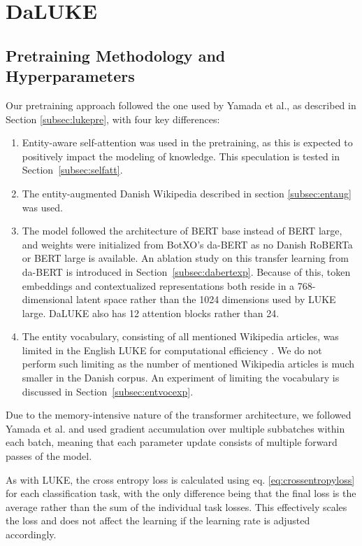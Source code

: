 \documentclass[main.tex]{subfiles}
\begin{document}
\section{DaLUKE}

\subsection{Pretraining Methodology and Hyperparameters}%
\label{sub:dalpre}
Our pretraining approach followed the one used by Yamada et al., as described in Section \ref{subsec:lukepre}, with four key differences:
\begin{enumerate}
    \item
        Entity-aware self-attention was used in the pretraining, as this is expected to positively impact the modeling of knowledge.
        This speculation is tested in Section~\ref{subsec:selfatt}.
    \item
        The entity-augmented Danish Wikipedia described in section \ref{subsec:entaug} was used.
    \item
        The model followed the architecture of BERT base instead of BERT large, and weights were initialized from BotXO's da-BERT \cite{botxo2019dabert} as no Danish RoBERTa or BERT large is available.
        An ablation study on this transfer learning from da-BERT is introduced in Section~\ref{subsec:dabertexp}.
        Because of this, token embeddings and contextualized representations both reside in a 768-dimensional latent space rather than the 1024 dimensions used by LUKE large.
        DaLUKE also has 12 attention blocks rather than 24.
        \cite[Sec. 3.4]{yamada2020luke}
    \item
        The entity vocabulary, consisting of all mentioned Wikipedia articles, was limited in the English LUKE for computational efficiency \cite[Sec. 3.4]{yamada2020luke}.
        We do not perform such limiting as the number of mentioned Wikipedia articles is much smaller in the Danish corpus.
        An experiment of limiting the vocabulary is discussed in Section~\ref{subsec:entvocexp}.
\end{enumerate}
Due to the memory-intensive nature of the transformer architecture, we followed Yamada et al. and used gradient accumulation over multiple subbatches within each batch, meaning that each parameter update consists of multiple forward passes of the model.

As with LUKE, the cross entropy loss is calculated using eq. \eqref{eq:crossentropyloss} for each classification task, with the only difference being that the final loss is the average rather than the sum of the individual task losses.
This effectively scales the loss and does not affect the learning if the learning rate is adjusted accordingly.
\end{document}
